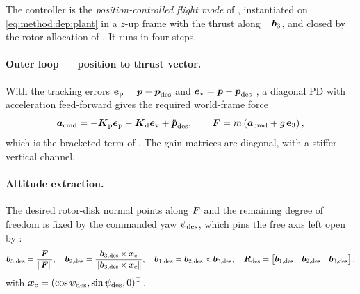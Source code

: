 The controller is the \emph{position-controlled flight mode} of
\parencite[Eqs.~(19)--(23)]{lee2010geometric}, instantiated on \eqref{eq:method:dep:plant} in a
$z$-up frame with the thrust along $+\boldsymbol{b}_{3}$, and closed by the rotor allocation of
\parencite{mellinger2011minimum}. It runs in four steps.

\paragraph{Outer loop --- position to thrust vector.} With the tracking errors
$\boldsymbol{e}_{\textrm{p}} = \boldsymbol{p}-\boldsymbol{p}_{\textrm{des}}$ and
$\boldsymbol{e}_{\textrm{v}} = \dot{\boldsymbol{p}}-\dot{\boldsymbol{p}}_{\textrm{des}}$
\parencite[Eqs.~(17)--(18)]{lee2010geometric}, a diagonal PD with acceleration feed-forward gives
the required world-frame force
\begin{equation}\label{eq:method:dep:outer}
  \boldsymbol{a}_{\textrm{cmd}} = -\boldsymbol{K}_{\textrm{p}}\boldsymbol{e}_{\textrm{p}} - \boldsymbol{K}_{\textrm{d}}\boldsymbol{e}_{\textrm{v}} + \ddot{\boldsymbol{p}}_{\textrm{des}},
  \qquad
  \boldsymbol{F} = m\left(\boldsymbol{a}_{\textrm{cmd}} + g\,\textbf{e}_{3}\right),
\end{equation}
which is the bracketed term of \parencite[Eq.~(23)]{lee2010geometric}. The gain matrices are
diagonal, with a stiffer vertical channel.

\paragraph{Attitude extraction.} The desired rotor-disk normal points along $\boldsymbol{F}$ and the remaining degree of
freedom is fixed by the commanded yaw $\psi_{\textrm{des}}$, which pins the free axis left open by
\parencite[Eqs.~(22)--(23)]{lee2010geometric}:
\begin{equation}\label{eq:method:dep:att}
  \boldsymbol{b}_{3,\mathrm{des}} = \frac{\boldsymbol{F}}{\|\boldsymbol{F}\|},\quad
  \boldsymbol{b}_{2,\mathrm{des}} = \frac{\boldsymbol{b}_{3,\mathrm{des}}\times\boldsymbol{x}_{\textrm{c}}}{\|\boldsymbol{b}_{3,\mathrm{des}}\times\boldsymbol{x}_{\textrm{c}}\|},\quad
  \boldsymbol{b}_{1,\mathrm{des}} = \boldsymbol{b}_{2,\mathrm{des}}\times\boldsymbol{b}_{3,\mathrm{des}},\quad
  \boldsymbol{R}_{\textrm{des}} = \begin{bmatrix}\boldsymbol{b}_{1,\mathrm{des}} & \boldsymbol{b}_{2,\mathrm{des}} & \boldsymbol{b}_{3,\mathrm{des}}\end{bmatrix},
\end{equation}
with $\boldsymbol{x}_{\textrm{c}} = (\cos\psi_{\textrm{des}},\sin\psi_{\textrm{des}},0)^{\textrm{T}}$.

